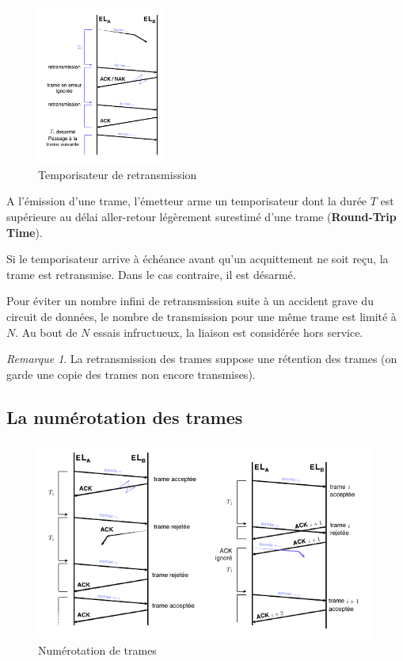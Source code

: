 \documentclass[11pt,english,french]{scrreprt}
\theoremstyle{remark}
\newtheorem*{rem*}{Remarque}
\theoremstyle{definition}
\begin{document}
\begin{figure}
	\vspace{-60pt}
	\begin{center}
		\includegraphics[width=0.38\textwidth]{graphes/temporisation2}
		\vspace{-15pt}
		\caption{Temporisateur de retransmission}
	\end{center}
	\vspace{-40pt}
\end{figure}

A l'émission d'une trame, l'émetteur arme un temporisateur dont la durée $T$ est supérieure au délai aller-retour légèrement surestimé d'une trame (\textbf{Round-Trip Time}).

Si le temporisateur arrive à échéance avant qu'un acquittement ne soit reçu, la trame est retransmise. Dans le cas contraire, il est désarmé.

Pour éviter un nombre infini de retransmission suite à un accident grave du circuit de données, le nombre de transmission pour une même trame est limité à $N$. Au bout de $N$ essais infructueux, la liaison est considérée hors service.

\begin{rem*}
	La retransmission des trames suppose une rétention des trames (on garde une copie des trames non encore transmises).
\end{rem*}

\subsection*{La numérotation des trames} %

\begin{figure}[h!]
	\center
	\includegraphics[scale=1.2]{graphes/numerotation}
	\caption{Numérotation de trames}
\end{figure}
\end{document}
